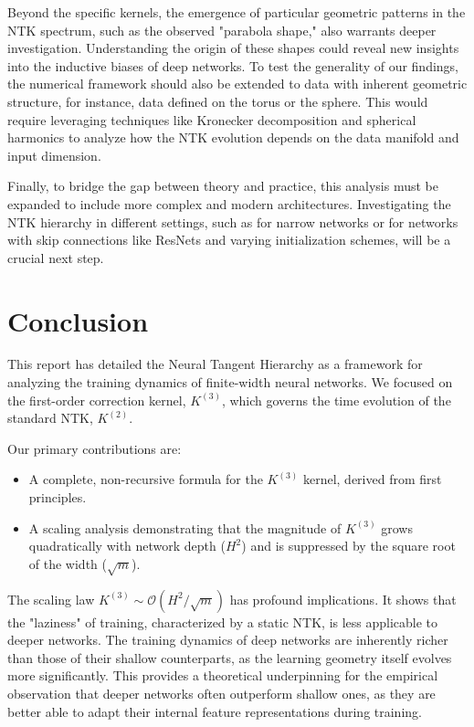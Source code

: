\documentclass{article}
\newcommand{\Order}{\mathcal{O}}
\begin{document}
Beyond the specific kernels, the emergence of particular geometric patterns in the NTK spectrum, such as the observed "parabola shape," also warrants deeper investigation. Understanding the origin of these shapes could reveal new insights into the inductive biases of deep networks. To test the generality of our findings, the numerical framework should also be extended to data with inherent geometric structure, for instance, data defined on the torus or the sphere. This would require leveraging techniques like Kronecker decomposition and spherical harmonics to analyze how the NTK evolution depends on the data manifold and input dimension.

Finally, to bridge the gap between theory and practice, this analysis must be expanded to include more complex and modern architectures. Investigating the NTK hierarchy in different settings, such as for narrow networks or for networks with skip connections like ResNets and varying initialization schemes, will be a crucial next step.

\section{Conclusion}

This report has detailed the Neural Tangent Hierarchy as a framework for analyzing the training dynamics of finite-width neural networks. We focused on the first-order correction kernel, $K^{(3)}$, which governs the time evolution of the standard NTK, $K^{(2)}$.

Our primary contributions are:
\begin{itemize}
    \item A complete, non-recursive formula for the $K^{(3)}$ kernel, derived from first principles.
    \item A scaling analysis demonstrating that the magnitude of $K^{(3)}$ grows quadratically with network depth ($H^2$) and is suppressed by the square root of the width ($\sqrt{m}$).
\end{itemize}

The scaling law $K^{(3)} \sim \Order(H^2/\sqrt{m})$ has profound implications. It shows that the "laziness" of training, characterized by a static NTK, is less applicable to deeper networks. The training dynamics of deep networks are inherently richer than those of their shallow counterparts, as the learning geometry itself evolves more significantly. This provides a theoretical underpinning for the empirical observation that deeper networks often outperform shallow ones, as they are better able to adapt their internal feature representations during training.
\end{document}
